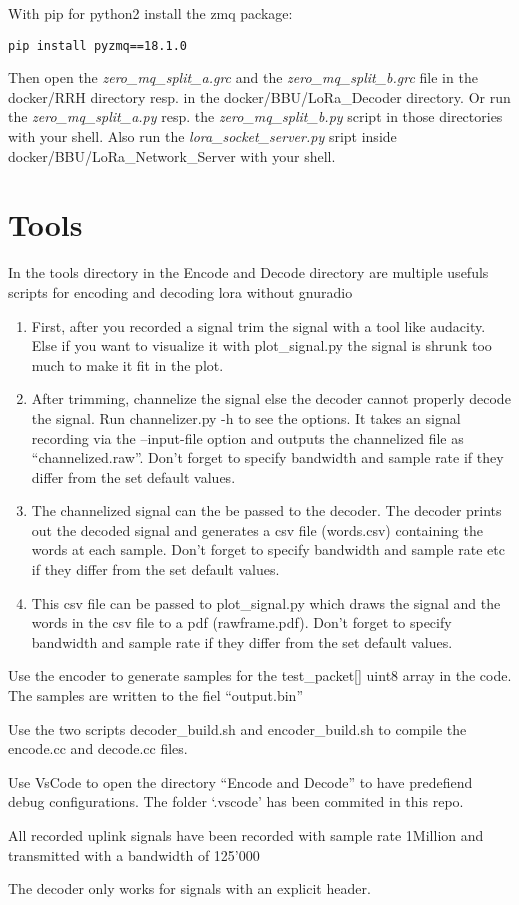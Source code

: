 With pip for python2 install the zmq package:

\begin{verbatim}
pip install pyzmq==18.1.0
\end{verbatim}

Then open the \emph{zero\_mq\_split\_a.grc} and the
\emph{zero\_mq\_split\_b.grc} file in the docker/RRH directory resp. in
the docker/BBU/LoRa\_Decoder directory. Or run the
\emph{zero\_mq\_split\_a.py} resp. the \emph{zero\_mq\_split\_b.py}
script in those directories with your shell. Also run the
\emph{lora\_socket\_server.py} sript inside
docker/BBU/LoRa\_Network\_Server with your shell.

\section{Tools}\label{tools}

In the tools directory in the Encode and Decode directory are multiple
usefuls scripts for encoding and decoding lora without gnuradio

\begin{enumerate}
\def\labelenumi{\arabic{enumi}.}
\item
  First, after you recorded a signal trim the signal with a tool like
  audacity. Else if you want to visualize it with plot\_signal.py the
  signal is shrunk too much to make it fit in the plot.
\item
  After trimming, channelize the signal else the decoder cannot properly
  decode the signal. Run channelizer.py -h to see the options. It takes
  an signal recording via the --input-file option and outputs the
  channelized file as ``channelized.raw''. Don't forget to specify
  bandwidth and sample rate if they differ from the set default values.
\item
  The channelized signal can the be passed to the decoder. The decoder
  prints out the decoded signal and generates a csv file (words.csv)
  containing the words at each sample. Don't forget to specify bandwidth
  and sample rate etc if they differ from the set default values.
\item
  This csv file can be passed to plot\_signal.py which draws the signal
  and the words in the csv file to a pdf (rawframe.pdf). Don't forget to
  specify bandwidth and sample rate if they differ from the set default
  values.
\end{enumerate}

Use the encoder to generate samples for the test\_packet{[}{]} uint8
array in the code. The samples are written to the fiel ``output.bin''

Use the two scripts decoder\_build.sh and encoder\_build.sh to compile
the encode.cc and decode.cc files.

Use VsCode to open the directory ``Encode and Decode'' to have
predefiend debug configurations. The folder `.vscode' has been commited
in this repo.

All recorded uplink signals have been recorded with sample rate 1Million
and transmitted with a bandwidth of 125'000

The decoder only works for signals with an explicit header.
